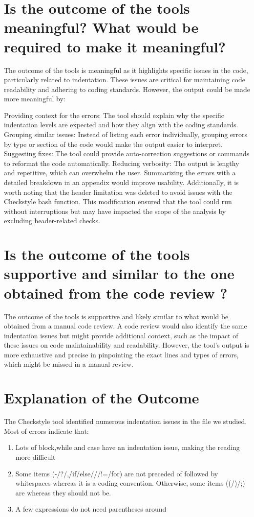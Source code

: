 \documentclass[twocolumn,10pt]{article}
\begin{document}
\section{ Is the outcome of the tools meaningful? What would be required to make it meaningful?}

The outcome of the tools is meaningful as it highlights specific issues in the code, particularly related to indentation. These issues are critical for maintaining code readability and adhering to coding standards. However, the output could be made more meaningful by:

Providing context for the errors: The tool should explain why the specific indentation levels are expected and how they align with the coding standards.
Grouping similar issues: Instead of listing each error individually, grouping errors by type or section of the code would make the output easier to interpret.
Suggesting fixes: The tool could provide auto-correction suggestions or commands to reformat the code automatically.
Reducing verbosity: The output is lengthy and repetitive, which can overwhelm the user. Summarizing the errors with a detailed breakdown in an appendix would improve usability.
Additionally, it is worth noting that the header limitation was deleted to avoid issues with the Checkstyle bash function. This modification ensured that the tool could run without interruptions but may have impacted the scope of the analysis by excluding header-related checks.

\section{Is the outcome of the tools supportive and similar to the one obtained from the code review ?}
The outcome of the tools is supportive and likely similar to what would be obtained from a manual code review. A code review would also identify the same indentation issues but might provide additional context, such as the impact of these issues on code maintainability and readability. However, the tool's output is more exhaustive and precise in pinpointing the exact lines and types of errors, which might be missed in a manual review.

\section{Explanation of the Outcome}
The Checkstyle tool identified numerous indentation issues in the file we studied. Most of errors indicate that: 
\begin{enumerate}[itemsep=0pt, topsep=0pt]
    \item Lots of block,while and case have an indentation issue, making the reading more difficult
    \item Some items (-/?/,/if/else/{/}/!=/for) are not preceded of followed by whitespaces whereas it is a coding convention. Otherwise, some items ((/)/;) are whereas they should not be.
    \item A few expressions do not need parentheses around 
\end{enumerate}
\end{document}
